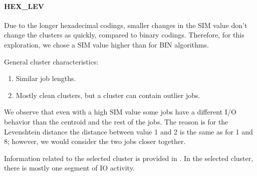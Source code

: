 \documentclass{jhps}
\begin{document}
\FloatBarrier
\paragraph{HEX\_LEV}
Due to the longer hexadecimal codings, smaller changes in the SIM value don't change the clusters as quickly,  compared to binary codings.
Therefore, for this exploration, we chose a SIM value higher than for BIN algorithms.

General cluster characteristics:
\begin{enumerate}
 \item Similar job lengths.
 \item Mostly clean clusters, but a cluster can contain outlier jobs.
\end{enumerate}

We observe that even with a high SIM value some jobs have a different I/O behavior than the centroid and the rest of the jobs.
The reason is for the Levenshtein distance the distance between value 1 and 2 is the same as for 1 and 8; however, we would consider the two jobs closer together.

Information related to the selected cluster is provided in .
In the selected cluster, there is mostly one segment of IO activity.
\end{document}
